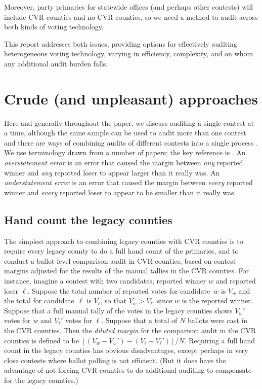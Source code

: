 \documentclass[12pt]{article}
\begin{document}
Moreover, party primaries for statewide offices (and perhaps other contests) will
include CVR counties and no-CVR counties, so we need a method to audit
across both kinds of voting technology. %

This report addresses both issues, providing 
options for effectively auditing  %
heterogeneous 
voting technology, varying in efficiency, complexity, and on whom any additional audit burden falls.

\section{Crude (and unpleasant) approaches} \label{sec:crude}


Here and generally throughout the paper, we 
discuss auditing a single contest at a time, although the same sample can be used to audit
more than one contest and there are ways of combining audits of different contests into
a single process \citep{stark09c,stark10d}.
We use terminology drawn from a number of papers; the key reference is \citet{lindemanStark12}.
An \emph{overstatement error} is an error that caused the margin between \emph{any} reported
winner and \emph{any} reported loser to appear larger than it really was.
An \emph{understatement error} is an error that caused the margin between \emph{every} reported
winner and \emph{every} reported loser to appear to be smaller than it really was.

\subsection{Hand count the legacy counties}
The simplest approach to combining legacy counties with CVR counties is to require every
legacy county to do a full hand count of the primaries, and to conduct a 
ballot-level comparison audit in CVR counties, based on contest margins adjusted for
the results of the manual tallies in the CVR counties.
For instance, imagine a contest with two candidates, reported winner $w$ and reported loser $\ell$.
Suppose the total number of reported votes for candidate~$w$ is $V_w$ 
and the total for candidate~$\ell$ is $V_\ell$, so that $V_w > V_\ell$, since 
$w$ is the reported winner.
Suppose that a full manual tally of the votes in the legacy counties shows $V_w'$ votes for $w$ and
$V_\ell'$ votes for $\ell$.
Suppose that a total of $N$ ballots were cast in the CVR counties.
Then the \emph{diluted margin}  for the comparison audit in the CVR counties is defined to be
$[(V_w-V_w')-(V_\ell-V_\ell')]/N$.
Requiring a full hand count in the legacy counties has obvious disadvantages, except perhaps in very 
close contests where ballot polling is not efficient. (But it does have the advantage of not forcing CVR 
counties to do additional auditing to compensate for the legacy counties.)
\end{document}
